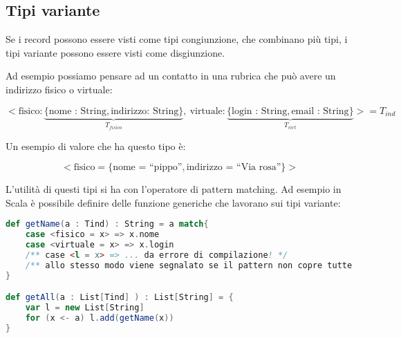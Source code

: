 

\subsection{Tipi variante}

Se i record possono essere visti come tipi congiunzione, che combinano più tipi, i tipi variante possono essere visti come disgiunzione.

Ad esempio possiamo pensare ad un contatto in una rubrica che può avere un indirizzo fisico o virtuale:

$$
< \text{fisico}: \underbrace{\{ \text{nome : String}, \text{indirizzo: String} \}}_{T_{fisico}} , \: \text{virtuale}: \underbrace{\{ \text{login : String}, \text{email : String} \}}_{T_{virt}} >= T_{ind}
$$

\noindent Un esempio di valore che ha questo tipo è:

$$
< \text{fisico} = \{ \text{nome = ``pippo''}, \text{indirizzo =  ``Via rosa''} \} >
$$

\noindent L'utilità di questi tipi si ha con l'operatore di pattern matching.
Ad esempio in Scala è possibile definire delle funzione generiche che lavorano sui tipi variante:

\begin{lstlisting}[language=Scala, caption=Utilizzo del pattern matching in Scala]
def getName(a : Tind) : String = a match{
	case <fisico = x> => x.nome
	case <virtuale = x> => x.login
	/** case <l = x> => ... da errore di compilazione! */
	/** allo stesso modo viene segnalato se il pattern non copre tutte le possibili etichette */
}

def getAll(a : List[Tind] ) : List[String] = {
	var l = new List[String]
	for (x <- a) l.add(getName(x))
}
\end{lstlisting}

